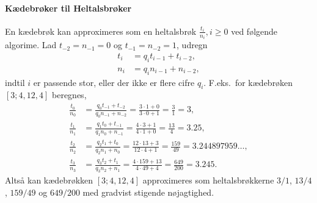 \paragraph{Kædebrøker til Heltalsbrøker}
En kædebrøk kan approximeres som en heltalsbrøk
$\frac{t_i}{n_i}, i \geq 0$ ved følgende algorime. Lad
$t_{-2} = n_{-1} = 0$ og $t_{-1} = n_{-2} =1$, udregn
\begin{align}
  t_i &= q_it_{i-1}+t_{i-2},
  \\n_i &= q_in_{i-1}+n_{i-2},
\end{align}
indtil $i$ er passende stor, eller der ikke er flere cifre
$q_i$.  F.eks.\ for kædebrøken $[3; 4, 12, 4]$ beregnes,
\begin{align}
  \frac{t_0}{n_0} &= \frac{q_0t_{-1} + t_{-2}}{q_0n_{-1}+n_{-2}} = \frac{3\cdot 1+0}{3\cdot 0 + 1} = \frac{3}{1} = 3,
  \\\frac{t_1}{n_1} &= \frac{q_1t_0 + t_{-1}}{q_1n_0+n_{-1}} = \frac{4\cdot 3 + 1}{4\cdot 1+0} = \frac{13}{4} = 3.25,
  \\\frac{t_2}{n_2} &= \frac{q_2t_1 + t_{0}}{q_2n_1+n_{0}} = \frac{12\cdot 13 + 3}{12\cdot 4 + 1} = \frac{159}{49} = 3.244897959\ldots,
  \\\frac{t_3}{n_3} &= \frac{q_3t_2 + t_{1}}{q_3n_2+n_{1}} = \frac{4\cdot 159 + 13}{4\cdot 49+4} = \frac{649}{200} = 3.245.
\end{align}
Altså kan kædebrøkken $[3;4, 12, 4]$ approximeres som heltalsbrøkkerne
$3/1$, $13/4$, $159/49$ og $649/200$ med gradvist stigende nøjagtighed.


